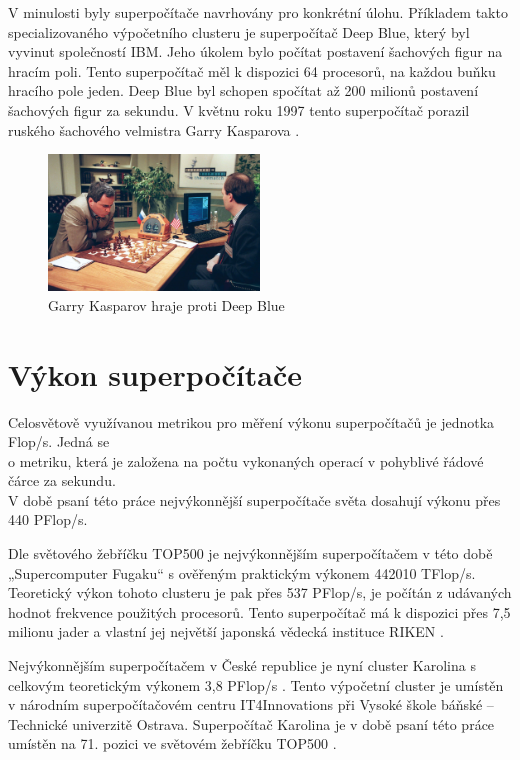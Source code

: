 V minulosti byly superpočítače navrhovány pro konkrétní úlohu. Příkladem takto specializovaného výpočetního clusteru je superpočítač Deep Blue, který byl vyvinut společností IBM. Jeho úkolem bylo počítat postavení šachových figur na hracím poli. Tento superpočítač měl k dispozici 64 procesorů, na každou buňku hracího pole jeden. Deep Blue byl schopen spočítat až 200 milionů postavení šachových figur za sekundu. V květnu roku 1997 tento superpočítač porazil ruského šachového velmistra Garry Kasparova \cite{Hosch20191128}.

\begin{figure}[h]
	\centering
	\includegraphics[width=0.5\textwidth]{Figures/Garry-Kasparov-playing-against-Deep-Blue.jpeg}
	\caption{Garry Kasparov hraje proti Deep Blue \cite{Hosch20191128}}
	\label{fig:garry-kasparov}
\end{figure}

\section{Výkon superpočítače}
Celosvětově využívanou metrikou pro měření výkonu superpočítačů je jednotka Flop/s. Jedná se \\o metriku, která je založena na počtu vykonaných operací v pohyblivé řádové čárce za sekundu. \\V době psaní této práce nejvýkonnější superpočítače světa dosahují výkonu přes 440 PFlop/s.

Dle světového žebříčku TOP500 je nejvýkonnějším superpočítačem v této době 
„Supercomputer Fugaku“ s ověřeným praktickým výkonem 442010 TFlop/s. Teoretický výkon tohoto clusteru je pak přes 537 PFlop/s, je počítán z udávaných hodnot frekvence použitých procesorů. Tento superpočítač má k dispozici přes 7,5 milionu jader a vlastní jej největší japonská vědecká instituce RIKEN \cite{B2TvJy8L3mSIxfWp}.

Nejvýkonnějším superpočítačem v České republice je nyní cluster Karolina s celkovým teoretickým výkonem 3,8 PFlop/s \cite{oviOzaWRPKlKSq7K}. Tento výpočetní cluster je umístěn v národním superpočítačovém centru IT4Innovations při Vysoké škole báňské – Technické univerzitě Ostrava. Superpočítač Karolina je v době psaní této práce umístěn na 71. pozici ve světovém žebříčku TOP500 \cite{iqgLoV1cXM0Qb6t1}.

